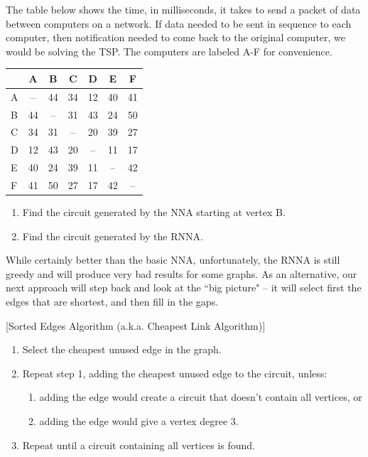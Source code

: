 \begin{exercise}{}{} %
The table below shows the time, in milliseconds, it takes to send a packet of data between computers on a network.  If data needed to be sent in sequence to each computer, then notification needed to come back to the original computer, we would be solving the TSP. The computers are labeled A-F for convenience. 
\begin{center}
\begin{tabular}{|l|c|c|c|c|c|c|}
\hline
&A&B&C&D&E&F\\
\hline
A&--&44&34&12&40&41\\
\hline
B&44&--&31&43&24&50\\
\hline 
C&34&31&--&20&39&27\\
\hline
D&12&43&20&--&11&17\\
\hline
E&40&24&39&11&--&42\\
\hline
F&41&50&27&17&42&--\\
\hline
\end{tabular}
\end{center}

\begin{enumerate}[label=\alph*.]
\item	Find the circuit generated by the NNA starting at vertex B.
\item	Find the circuit generated by the RNNA.
\end{enumerate}
\end{exercise}



While certainly better than the basic NNA, unfortunately, the RNNA is still greedy and will produce very bad results for some graphs.  As an alternative, our next approach will step back and look at the ``big picture" -- it will select first the edges that are shortest, and then fill in the gaps.


\begin{algorithm}{}{}[Sorted Edges Algorithm (a.k.a. Cheapest Link Algorithm)]
\hspace{3in}
\begin{enumerate}
\item Select the cheapest unused edge in the graph.
\item Repeat step 1, adding the cheapest unused edge to the circuit, unless:
\begin{enumerate}
\item adding the edge would create a circuit that doesn't contain all vertices, or
\item adding the edge would give a vertex degree 3.
\end{enumerate}
\item Repeat until a circuit containing all vertices is found.
\end{enumerate}
\end{algorithm}


